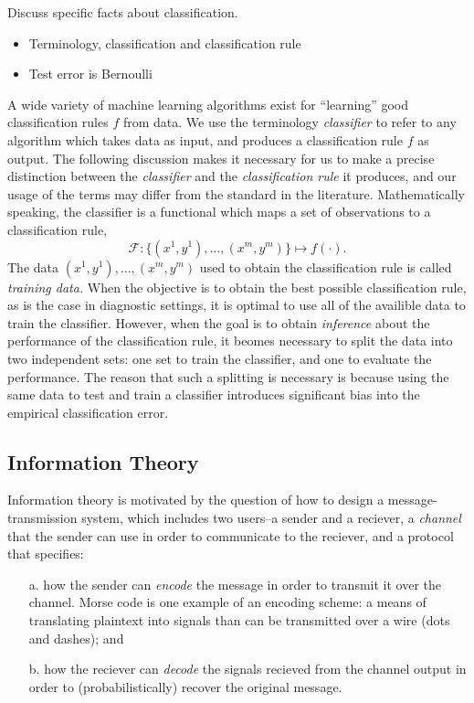 Discuss specific facts about classification.

\begin{itemize}
\item Terminology, classification and classification rule
\item Test error is Bernoulli
\end{itemize}

A wide variety of machine learning algorithms exist for ``learning''
good classification rules $f$ from data.  We use the terminology
\emph{classifier} to refer to any algorithm which takes data as input,
and produces a classification rule $f$ as output.  The following
discussion makes it necessary for us to make a precise distinction
between the \emph{classifier} and the \emph{classification rule} it
produces, and our usage of the terms may differ from the standard in
the literature.  Mathematically speaking, the classifier is a
functional which maps a set of observations to a classification rule,
\[
\mathcal{F}: \{(x^{1},y^{1}),\hdots, (x^{m}, y^{m})\} \mapsto f(\cdot).
\]
The data $(x^1,y^1),\hdots, (x^m, y^m)$ used to obtain the
classification rule is called \emph{training data.}  When the
objective is to obtain the best possible classification rule, as is
the case in diagnostic settings, it is optimal to use all of the
availible data to train the classifier.  However, when the goal is to
obtain \emph{inference} about the performance of the classification
rule, it beomes necessary to split the data into two independent sets:
one set to train the classifier, and one to evaluate the performance.
The reason that such a splitting is necessary is because using the
same data to test and train a classifier introduces significant bias
into the empirical classification error.


\subsection{Information Theory}\label{sec:intro_mi}


Information theory is motivated by the question of how to design a
message-transmission system, which includes two users--a sender and a
reciever, a \emph{channel} that the sender can use in order to
communicate to the reciever, and a protocol that specifies:
\begin{itemize}
\item[a.] how the sender can \emph{encode} the message in order to
  transmit it over the channel.  Morse code is one example of an
  encoding scheme: a means of translating plaintext into signals than
  can be transmitted over a wire (dots and dashes); and
\item[b.] how the reciever can \emph{decode} the signals recieved from
  the channel output in order to (probabilistically) recover the
  original message.
\end{itemize}


